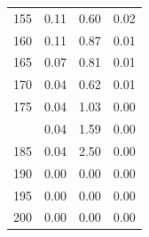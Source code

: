 \documentclass[12pt]{article}
\begin{document}
\begin{minipage}{0.5\textwidth}
\begin{tabular}{rccc}
    155 & 0.11 & 0.60 & 0.02 \\ 
    160 & 0.11 & 0.87 & 0.01 \\ 
    165 & 0.07 & 0.81 & 0.01 \\ 
    170 & 0.04 & 0.62 & 0.01 \\ 
    175 & 0.04 & 1.03 & 0.00 \\  \addlinespace
    180 & 0.04 & 1.59 & 0.00 \\ 
    185 & 0.04 & 2.50 & 0.00 \\ 
    190 & 0.00 & 0.00 & 0.00 \\ 
    195 & 0.00 & 0.00 & 0.00 \\ 
    200 & 0.00 & 0.00 & 0.00 \\  

\bottomrule
\end{tabular}

\end{minipage} \hfill
\end{document}

